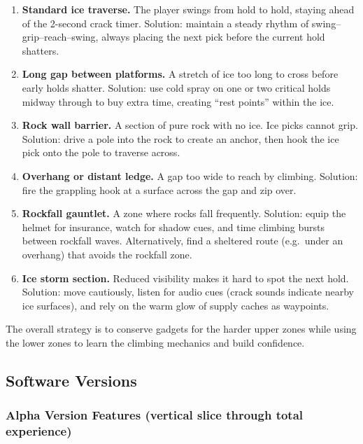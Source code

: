\documentclass[12pt]{article}
\begin{document}
\begin{enumerate}[leftmargin=2em]
    \item \textbf{Standard ice traverse.} The player swings from hold to hold, staying ahead of the 2-second crack timer. Solution: maintain a steady rhythm of swing--grip--reach--swing, always placing the next pick before the current hold shatters.

    \item \textbf{Long gap between platforms.} A stretch of ice too long to cross before early holds shatter. Solution: use cold spray on one or two critical holds midway through to buy extra time, creating ``rest points'' within the ice.

    \item \textbf{Rock wall barrier.} A section of pure rock with no ice. Ice picks cannot grip. Solution: drive a pole into the rock to create an anchor, then hook the ice pick onto the pole to traverse across.

    \item \textbf{Overhang or distant ledge.} A gap too wide to reach by climbing. Solution: fire the grappling hook at a surface across the gap and zip over.

    \item \textbf{Rockfall gauntlet.} A zone where rocks fall frequently. Solution: equip the helmet for insurance, watch for shadow cues, and time climbing bursts between rockfall waves. Alternatively, find a sheltered route (e.g.\ under an overhang) that avoids the rockfall zone.

    \item \textbf{Ice storm section.} Reduced visibility makes it hard to spot the next hold. Solution: move cautiously, listen for audio cues (crack sounds indicate nearby ice surfaces), and rely on the warm glow of supply caches as waypoints.
\end{enumerate}

The overall strategy is to conserve gadgets for the harder upper zones while using the lower zones to learn the climbing mechanics and build confidence.

\subsection{Software Versions}

\subsubsection{Alpha Version Features (vertical slice through total experience)}
\end{document}
